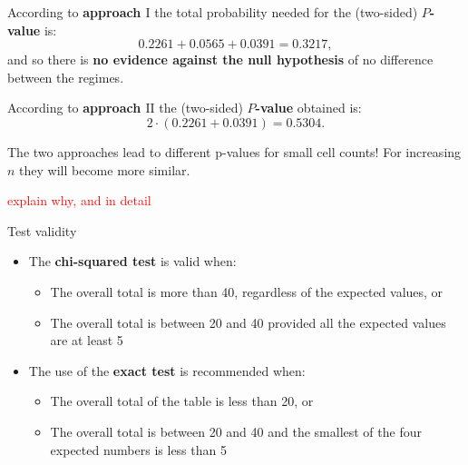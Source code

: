 \documentclass[compress, notes=hide]{beamer}
\newcommand{\hl}[1]{\textbf{#1}}
\begin{document}
\begin{frame}
\begin{block}{}
According to \hl{approach $\mathrm{I}$} the total probability needed for the (two-sided) \hl{$P$-value} is:
\begin{equation*}
0.2261 + 0.0565 + 0.0391 = 0.3217,
\end{equation*}
and so there is \textbf{no evidence against the null hypothesis }of no difference between the regimes. 

\vspace*{2em}
According to \hl{approach $\mathrm{II}$} the (two-sided) \hl{$P$-value} obtained is:
\begin{equation*}
2 \cdot (0.2261 + 0.0391) = 0.5304.
\end{equation*}

\vspace*{2em}
The two approaches lead to different p-values for small cell counts! For increasing $n$ they will become more similar.

\textcolor{red}{explain why, and in detail }
\end{block}
\end{frame}


\begin{frame}
	\begin{block}{Test validity}
		\begin{itemize}
			\item The \hl{chi-squared test} is valid when:
			\begin{itemize}
				\item{The overall total is more than 40, regardless of the expected
					values, or}
				\item{The overall total is between 20 and 40 provided all the expected
					values are at least 5}
			\end{itemize}
			\item The use of the \hl{exact test} is recommended when:
			\begin{itemize}
				\item{The overall total of the table is less than 20, or}
				\item{The overall total is between 20 and 40 and the smallest of the
					four expected numbers is less than 5}
			\end{itemize}
		\end{itemize}
	\end{block}
\end{frame}
\end{document}

